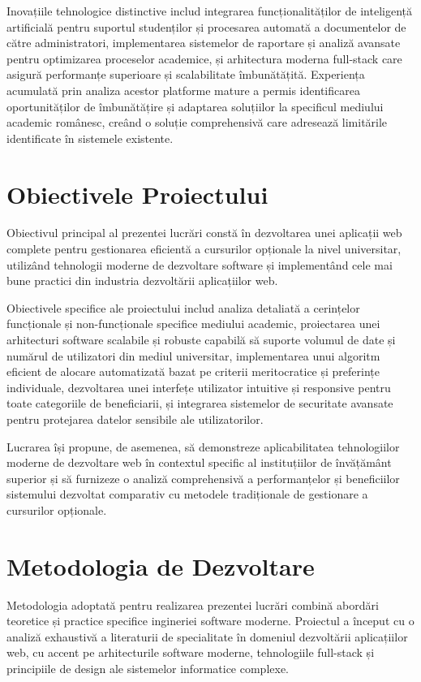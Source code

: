 \documentclass[12pt,a4paper]{report}
\begin{document}
Inovațiile tehnologice distinctive includ integrarea funcționalităților de inteligență artificială pentru suportul studenților și procesarea automată a documentelor de către administratori, implementarea sistemelor de raportare și analiză avansate pentru optimizarea proceselor academice, și arhitectura moderna full-stack care asigură performanțe superioare și scalabilitate îmbunătățită. Experiența acumulată prin analiza acestor platforme mature a permis identificarea oportunităților de îmbunătățire și adaptarea soluțiilor la specificul mediului academic românesc, creând o soluție comprehensivă care adresează limitările identificate în sistemele existente.

\section{Obiectivele Proiectului}

Obiectivul principal al prezentei lucrări constă în dezvoltarea unei aplicații web complete pentru gestionarea eficientă a cursurilor opționale la nivel universitar, utilizând tehnologii moderne de dezvoltare software și implementând cele mai bune practici din industria dezvoltării aplicațiilor web.

Obiectivele specifice ale proiectului includ analiza detaliată a cerințelor funcționale și non-funcționale specifice mediului academic, proiectarea unei arhitecturi software scalabile și robuste capabilă să suporte volumul de date și numărul de utilizatori din mediul universitar, implementarea unui algoritm eficient de alocare automatizată bazat pe criterii meritocratice și preferințe individuale, dezvoltarea unei interfețe utilizator intuitive și responsive pentru toate categoriile de beneficiarii, și integrarea sistemelor de securitate avansate pentru protejarea datelor sensibile ale utilizatorilor.

Lucrarea își propune, de asemenea, să demonstreze aplicabilitatea tehnologiilor moderne de dezvoltare web în contextul specific al instituțiilor de învățământ superior și să furnizeze o analiză comprehensivă a performanțelor și beneficiilor sistemului dezvoltat comparativ cu metodele tradiționale de gestionare a cursurilor opționale.

\section{Metodologia de Dezvoltare}

Metodologia adoptată pentru realizarea prezentei lucrări combină abordări teoretice și practice specifice ingineriei software moderne. Proiectul a început cu o analiză exhaustivă a literaturii de specialitate în domeniul dezvoltării aplicațiilor web, cu accent pe arhitecturile software moderne, tehnologiile full-stack și principiile de design ale sistemelor informatice complexe.
\end{document}
